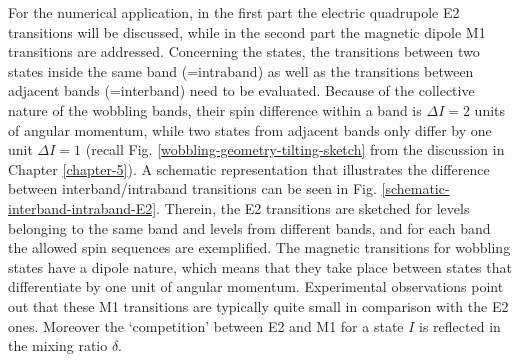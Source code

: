 For the numerical application, in the first part the electric quadrupole E2 transitions will be discussed, while in the second part the magnetic dipole M1 transitions are addressed. Concerning the states, the transitions between two states inside the same band (=intraband) as well as the transitions between adjacent bands (=interband) need to be evaluated. Because of the collective nature of the wobbling bands, their spin difference within a band is $\Delta I=2$ units of angular momentum, while two states from adjacent bands only differ by one unit $\Delta I=1$ (recall Fig. \ref{wobbling-geometry-tilting-sketch} from the discussion in Chapter \ref{chapter-5}). A schematic representation that illustrates the difference between interband/intraband transitions can be seen in Fig. \ref{schematic-interband-intraband-E2}. Therein, the E2 transitions are sketched for levels belonging to the same band and levels from different bands, and for each band the allowed spin sequences are exemplified. The magnetic transitions for wobbling states have a dipole nature, which means that they take place between states that differentiate by one unit of angular momentum. Experimental observations point out that these M1 transitions are typically quite small in comparison with the E2 ones. Moreover the `competition' between E2 and M1 for a state $I$ is reflected in the mixing ratio $\delta$. 
